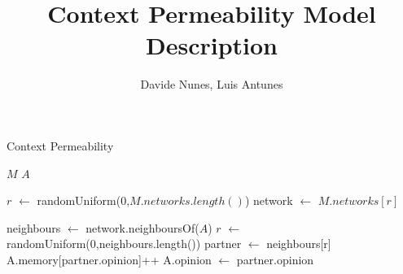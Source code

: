 \documentclass{article}
\title{Context Permeability Model Description}
\author{Davide Nunes, Luis Antunes}
\begin{document}
 
 \maketitle
 
 \begin{algorithm}
 \caption{Context Permeability}
 \label{alg:gencontevo}
 \begin{algorithmic}
 \vspace{0.5em}
 \STATE $M$ 
 \STATE $A$ 
 \\ \hrulefill 
 
 \STATE{}
 \STATE $r$ $\leftarrow$ randomUniform(0,$ M.networks.length() $)
 \STATE network $\leftarrow$ $M.networks[r]$
 
 \STATE
 \STATE {}
 \STATE neighbours $\leftarrow$ network.neighboursOf($A$) 
 \STATE $r$ $\leftarrow$ randomUniform(0,neighbours.length())
 \STATE partner $\leftarrow$ neighbours[r]
 \STATE
 \STATE {}
 \STATE A.memory[partner.opinion]++
 \STATE A.opinion $\leftarrow$ partner.opinion
 \ENDIF
 
 
 
 \end{algorithmic}
 \end{algorithm}
 
 
 
\end{document}

